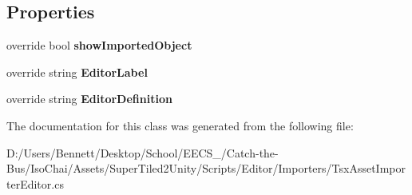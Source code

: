 \subsection*{Properties}
\begin{DoxyCompactItemize}
\item 
\mbox{\label{class_super_tiled2_unity_1_1_editor_1_1_tsx_asset_importer_editor_a361c6dba70d9b41ac1c9cf1a73543011}} 
override bool {\bfseries show\+Imported\+Object}
\item 
\mbox{\label{class_super_tiled2_unity_1_1_editor_1_1_tsx_asset_importer_editor_a20a70ad5c2f5009e05b820a8686fac89}} 
override string {\bfseries Editor\+Label}
\item 
\mbox{\label{class_super_tiled2_unity_1_1_editor_1_1_tsx_asset_importer_editor_ab812d5cc2068696fa3c592d59f3449e6}} 
override string {\bfseries Editor\+Definition}
\end{DoxyCompactItemize}


The documentation for this class was generated from the following file\+:\begin{DoxyCompactItemize}
\item 
D\+:/\+Users/\+Bennett/\+Desktop/\+School/\+E\+E\+C\+S\+\_/\+Catch-\/the-\/\+Bus/\+Iso\+Chai/\+Assets/\+Super\+Tiled2\+Unity/\+Scripts/\+Editor/\+Importers/Tsx\+Asset\+Importer\+Editor.\+cs\end{DoxyCompactItemize}
